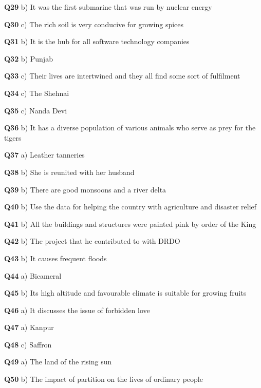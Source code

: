 \textbf{Q29} b) It was the first submarine that was run by nuclear energy\par
\textbf{Q30} c) The rich soil is very conducive for growing spices\par
\textbf{Q31} b) It is the hub for all software technology companies\par
\textbf{Q32} b) Punjab\par
\textbf{Q33} c) Their lives are intertwined and they all find some sort of fulfilment\par
\textbf{Q34} c) The Shehnai\par
\textbf{Q35} c) Nanda Devi\par
\textbf{Q36} b) It has a diverse population of various animals who serve as prey for the tigers\par
\textbf{Q37} a) Leather tanneries\par
\textbf{Q38} b) She is reunited with her husband\par
\textbf{Q39} b) There are good monsoons and a river delta\par
\textbf{Q40} b) Use the data for helping the country with agriculture and disaster relief\par
\textbf{Q41} b) All the buildings and structures were painted pink by order of the King\par
\textbf{Q42} b) The project that he contributed to with DRDO\par
\textbf{Q43} b) It causes frequent floods\par
\textbf{Q44} a) Bicameral\par
\textbf{Q45} b) Its high altitude and favourable climate is suitable for growing fruits\par
\textbf{Q46} a) It discusses the issue of forbidden love\par
\textbf{Q47} a) Kanpur\par
\textbf{Q48} c) Saffron\par
\textbf{Q49} a) The land of the rising sun\par
\textbf{Q50} b) The impact of partition on the lives of ordinary people\par